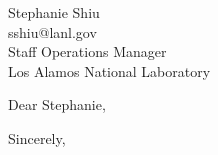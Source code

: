 \documentclass[10pt,article]{letter}
\makeatletter
\def\hm{Stephanie Shiu} %
\def\firstname{Stephanie}
\def\hremail{sshiu@lanl.gov}
\def\position{Staff Operations Manager} %
\def\company{Los Alamos National Laboratory} %
\makeatother
\begin{document}
\begin{letter}{\hm \\ \hremail \\ \position \\ \company}

\opening{Dear \firstname,}

\setlength\parindent{.5in}



 

\closing{Sincerely,}
\end{letter}
\end{document}
